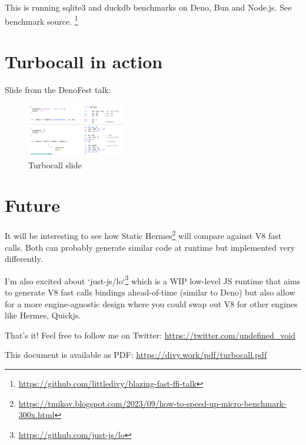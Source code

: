 \documentclass{article}
\begin{document}
This is running sqlite3 and duckdb benchmarks on Deno, Bun and Node.js. See benchmark source. \footnote{\url{https://github.com/littledivy/blazing-fast-ffi-talk}}

\section{Turbocall in action}

Slide from the DenoFest talk:

\begin{figure}
\begin{center}
\includegraphics[width=0.38\textwidth]{assets/turbocall-slide.png}
\end{center}
\caption{Turbocall slide}
\end{figure}

\section{Future}

It will be interesting to see how Static Hermes\footnote{\url{https://tmikov.blogspot.com/2023/09/how-to-speed-up-micro-benchmark-300x.html}} will compare against 
V8 fast calls. Both can probably generate similar code at runtime but implemented very differently.

I'm also excited about `just-js/lo`\footnote{\url{https://github.com/just-js/lo}} which is a WIP low-level JS runtime that 
aims to generate V8 fast calls bindings ahead-of-time (similar to Deno) but also allow for
a more engine-agnostic design where you could swap out V8 for other engines like Hermes, Quickjs.

That's it! Feel free to follow me on Twitter: \url{https://twitter.com/undefined_void}

This document is available as PDF: \url{https://divy.work/pdf/turbocall.pdf}
\end{document}
